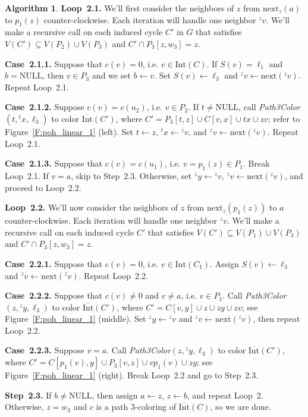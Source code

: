 \documentclass[12pt,letterpaper]{article}
\newcommand{\adj}[2]{{}^{#1}{#2}}
\newcommand{\nxt}{\text{next}}
\newcommand{\graphinto}{\text{Int}}
\newcommand{\graphintc}{\overline{\text{Int}}}
\theoremstyle{plain}
\theoremstyle{definition}
\theoremstyle{break}
\newtheorem{algorithm}[lemma]{Algorithm}     %
\begin{document}
\begin{algorithm}
\textbf{Loop~2.1.} We'll first consider the neighbors of
$z$ from
$\nxt_{z}(a)$ to $p_1(z)$ counter-clockwise. Each iteration
will handle one neighbor $\adj{z}{v}$.
We'll make a recursive call on each
induced cycle $C'$ in $G$ that satisfies
$V(C')\subseteq V(P_2)\cup V(P_3)$ and
$C'\cap P_3[z,w_3]=z$.

\textbf{Case~2.1.1.} Suppose that $c(v)=0$, i.e. $v\in\graphinto(C)$.
If $S(v)=\ell_1$ and $b=\text{NULL}$, then $v\in P_3$ and we set
$b\leftarrow v$. Set $S(v)\leftarrow \ell_3$ and
$\adj{z}{v}\leftarrow\nxt(\adj{z}{v})$.
Repeat Loop~2.1.

\textbf{Case~2.1.2.} Suppose $c(v)=c(u_2)$, i.e. $v\in P_2$.
If $t\ne\text{NULL}$, call \emph{Path3Color}$(t, \adj{t}{x}, \ell_3)$
to color $\graphintc(C')$, where
$C'=P_3[t,z]\cup C[v,x]\cup tx\cup zv$;
refer to Figure~\ref{F:poh_linear_1} (left).
Set $t\leftarrow z$, $\adj{t}{x}\leftarrow \adj{z}{v}$, and
$\adj{z}{v}\leftarrow\nxt(\adj{z}{v})$. Repeat Loop~2.1.

\textbf{Case~2.1.3.} Suppose that $c(v)=c(u_1)$, i.e. $v=p_1(z)\in P_1$.
Break Loop~2.1. If $v=a$, skip to Step~2.3. Otherwise, set
$\adj{z}{y}\leftarrow \adj{z}{v}$, $\adj{z}{v}\leftarrow\nxt(\adj{z}{v})$,
and proceed to Loop~2.2.

\textbf{Loop~2.2.} We'll now consider the
neighbors of $z$ from $\nxt_{z}(p_1(z))$ to $a$ counter-clockwise.
Each iteration will handle one neighbor $\adj{z}{v}$.
We'll make a recursive call on each
induced cycle $C'$ that satisfies $V(C')\subseteq V(P_1)\cup V(P_3)$
and $C'\cap P_3[z,w_3]=z$.

\textbf{Case~2.2.1.} Suppose that $c(v)=0$, i.e. $v\in\graphinto(C_1)$.
Assign $S(v)\leftarrow \ell_3$ and $\adj{z}{v}\leftarrow\nxt(\adj{z}{v})$.
Repeat Loop~2.2.

\textbf{Case~2.2.2.} Suppose that $c(v)\ne 0$ and $v\ne a$,
i.e. $v\in P_1$. Call \emph{Path3Color}$(z, \adj{z}{y}, \ell_3)$
to color $\graphintc(C')$,
where $C'=C[v,y]\cup z\cup zy\cup zv$;
see Figure~\ref{F:poh_linear_1} (middle).
Set $\adj{z}{y}\leftarrow\adj{z}{v}$ and
$\adj{z}{v}\leftarrow\nxt(\adj{z}{v})$, then
repeat Loop~2.2.

\textbf{Case~2.2.3.} 
Suppose $v=a$. Call \emph{Path3Color}$(z, \adj{z}{y}, \ell_3)$
to color $\graphintc(C')$,
where $C'=C[p_1(v),y]\cup P_3[v,z]\cup vp_1(v)\cup zy$;
see Figure~\ref{F:poh_linear_1} (right).
Break Loop~2.2 and go to Step~2.3.

\textbf{Step~2.3.} If $b\ne\text{NULL}$, then
assign $a\leftarrow z$, $z\leftarrow b$, and
repeat Loop~2. Otherwise, $z=w_3$ and $c$ is a path $3$-coloring of
$\graphintc(C)$, so we are done.
\end{algorithm}
\end{document}
